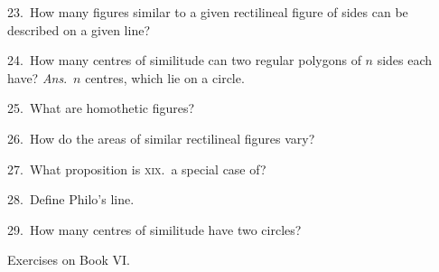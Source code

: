 \documentclass[oneside]{book}
\newcommand\exhead[1]{
\Needspace*{5\baselineskip}\begin{center}
\textsf{#1}
\end{center}
}
\begin{document}
\begin{footnotesize}
23.~How many figures similar to a given rectilineal figure of
sides can be described on a given line?

24.~How many centres of similitude can two regular polygons
of $n$ sides each have? \textit{Ans}.\ $n$ centres, which lie on a
circle.

25.~What are homothetic figures?

26.~How do the areas of similar rectilineal figures vary?

27.~What proposition is \textsc{xix}.\ a special case of?

28.~Define Philo's line.

29.~How many centres of similitude have two circles?
\par\end{footnotesize}

\exhead{Exercises on Book VI\@.}
\end{document}
